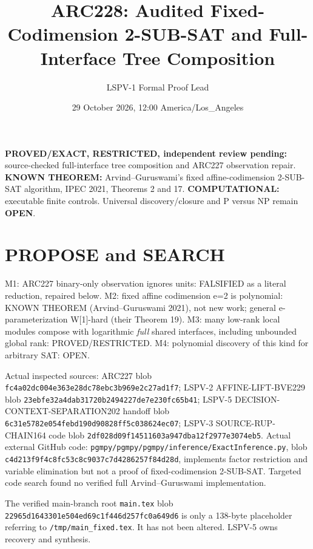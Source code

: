 \documentclass[11pt]{article}
\title{ARC228: Audited Fixed-Codimension 2-SUB-SAT and Full-Interface Tree Composition}
\author{LSPV-1 Formal Proof Lead}
\date{29 October 2026, 12:00 America/Los\_Angeles}
\begin{document}
\maketitle
\noindent\textbf{PROVED/EXACT, RESTRICTED, independent review pending:}
source-checked full-interface tree composition and ARC227 observation repair.
\textbf{KNOWN THEOREM:} Arvind--Guruswami's fixed affine-codimension 2-SUB-SAT algorithm, IPEC 2021, Theorems 2 and 17.
\textbf{COMPUTATIONAL:} executable finite controls.
Universal discovery/closure and P versus NP remain \textbf{OPEN}.

\section{PROPOSE and SEARCH}
M1: ARC227 binary-only observation ignores units: FALSIFIED as a literal reduction, repaired below.
M2: fixed affine codimension e=2 is polynomial: KNOWN THEOREM (Arvind--Guruswami 2021), not new work; general e-parameterization W[1]-hard (their Theorem 19).
M3: many low-rank local modules compose with logarithmic \emph{full} shared interfaces, including unbounded global rank: PROVED/RESTRICTED.
M4: polynomial discovery of this kind for arbitrary SAT: OPEN.

Actual inspected sources: ARC227 blob \texttt{fc4a02dc004e363e28dc78ebc3b969e2c27ad1f7};
LSPV-2 AFFINE-LIFT-BVE229 blob \texttt{23ebfe32a4dab31720b2494227de7e230fc65b41};
LSPV-5 DECISION-CONTEXT-SEPARATION202 handoff blob
\texttt{6c31e5782e054febd190d90828ff5c038624ec07};
LSPV-3 SOURCE-RUP-CHAIN164 code blob \texttt{2df028d09f14511603a947dba12f2977e3074eb5}.
Actual external GitHub code: \texttt{pgmpy/pgmpy/pgmpy/inference/ExactInference.py}, blob
\texttt{c4d213f9f4c8fc53c8c9037c7d4286257f84d28d}, implements factor restriction and variable elimination but not a proof of fixed-codimension 2-SUB-SAT. Targeted code search found no verified full Arvind--Guruswami implementation.

The verified main-branch root \texttt{main.tex} blob
\texttt{22965d1643301e504ed69c1f446d257fc0a649d6}
is only a 138-byte placeholder referring to \texttt{/tmp/main\_fixed.tex}.
It has not been altered. LSPV-5 owns recovery and synthesis.
\end{document}
